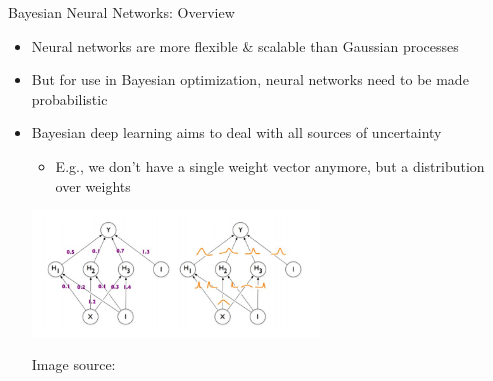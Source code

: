 \begin{frame}[c]{Bayesian Neural Networks: Overview}

\begin{itemize}
    \item Neural networks are more flexible \& scalable than Gaussian processes 
    \item But for use in Bayesian optimization, neural networks need to be made probabilistic
    
\fhpause
    \item Bayesian deep learning aims to deal with all sources of uncertainty \fhpause
    \begin{itemize}
        \item E.g., we don't have a single weight vector anymore, but a distribution over weights
    \end{itemize}

\centering
\includegraphics[width=0.6\textwidth]{images/surrogate_models/bnn.jpg}

\footnotesize{Image source: }

\end{itemize}



\end{frame}
%
%

